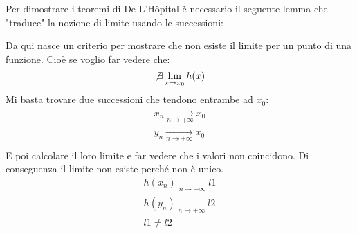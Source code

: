 Per dimostrare i teoremi di De L'Hôpital è necessario il seguente lemma che "traduce" la nozione di limite usando le successioni:

Da qui nasce un criterio per mostrare che non esiste il limite per un punto di una funzione. Cioè se voglio far vedere che:
\begin{equation*}
	\not \exists \lim_{x \to x_0} h(x)
\end{equation*}
Mi basta trovare due successioni che tendono entrambe ad $x_0$:
\begin{align*}
	x_n \xrightarrow[n \to + \infty]{} x_0\\
	y_n \xrightarrow[n \to + \infty]{} x_0\\
\end{align*}
E poi calcolare il loro limite e far vedere che i valori non coincidono. Di conseguenza il limite non esiste perché non è unico.
\begin{gather*}
	h(x_n) \xrightarrow[n \to +\infty]{} l1\\
	h(y_n) \xrightarrow[n \to +\infty]{} l2\\
	l1 \neq l2
\end{gather*}

